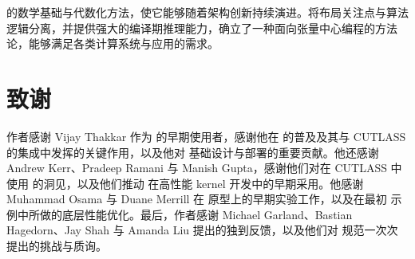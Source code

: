 \CuTe 的数学基础与代数化方法，使它能够随着架构创新持续演进。将布局关注点与算法逻辑分离，并提供强大的编译期推理能力，\CuTe 确立了一种面向张量中心编程的方法论，能够满足各类计算系统与应用的需求。

\section*{致谢}

作者感谢 Vijay Thakkar 作为 \CuTe 的早期使用者，感谢他在 \CuTe 的普及及其与 CUTLASS 的集成中发挥的关键作用，以及他对 \CuTe 基础设计与部署的重要贡献。他还感谢 Andrew Kerr、Pradeep Ramani 与 Manish Gupta，感谢他们对在 CUTLASS 中使用 \CuTe 的洞见，以及他们推动 \CuTe 在高性能 kernel 开发中的早期采用。他感谢 Muhammad Osama 与 Duane Merrill 在 \CuTe 原型上的早期实验工作，以及在最初 \CuTe 示例中所做的底层性能优化。最后，作者感谢 Michael Garland、Bastian Hagedorn、Jay Shah 与 Amanda Liu 提出的独到反馈，以及他们对 \CuTe 规范一次次提出的挑战与质询。


